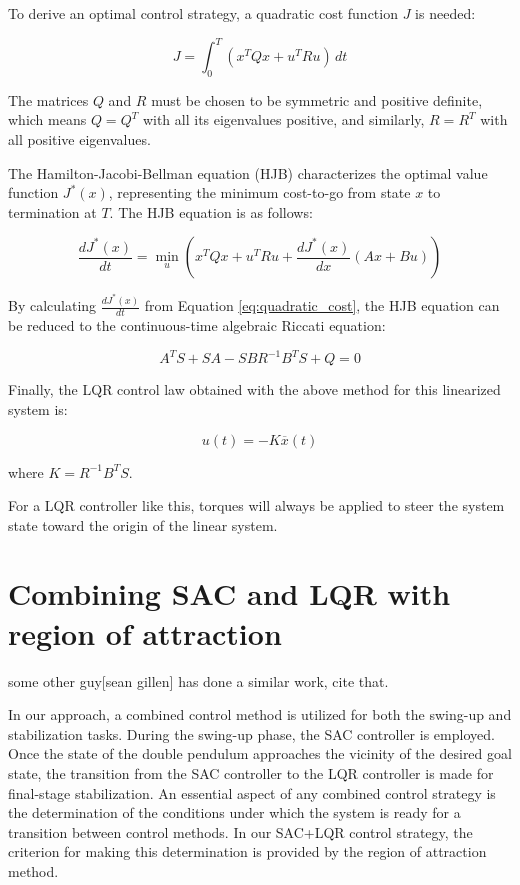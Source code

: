 To derive an optimal control strategy, a quadratic cost function \(J\) is needed:

\begin{equation}
  J = \int_0^{T} \left( x^T Q x + u^T R u \right) \, dt
  \label{eq:quadratic_cost}
\end{equation}

The matrices \(Q\) and \(R\) must be chosen to be symmetric and positive definite, which means \(Q = Q^T\) with all its eigenvalues positive, and similarly, \(R = R^T\) with all positive eigenvalues.

The Hamilton-Jacobi-Bellman equation (HJB) characterizes the optimal value function \(J^*(x)\), representing the minimum cost-to-go from state \(x\) to termination at \(T\). The HJB equation is as follows:

\begin{equation}
 \frac{dJ^*(x)}{dt} = \min_u \left( x^T Q x + u^T R u + \frac{dJ^*(x)}{dx} (Ax + Bu) \right)
 \label{eq:HJB}
\end{equation}

By calculating \(\frac{dJ^*(x)}{dt}\) from Equation \ref{eq:quadratic_cost}, the HJB equation can be reduced to the continuous-time algebraic Riccati equation:

\begin{equation}
 A^T S + SA - SBR^{-1}B^T S + Q = 0
\end{equation}

Finally, the LQR control law obtained with the above method for this linearized system is:

\begin{equation}
 u(t) = -K\overline{x}(t)
\end{equation}

where \(K = R^{-1}B^T S\).

For a LQR controller like this, torques will always be applied to steer the system state toward the origin of the linear system.


\section{Combining SAC and LQR with region of attraction}
some other guy[sean gillen] has done a similar work, cite that.

In our approach, a combined control method is utilized for both the swing-up and stabilization tasks. During the swing-up phase, the SAC controller is employed. Once the state of the double pendulum approaches the vicinity of the desired goal state, the transition from the SAC controller to the LQR controller is made for final-stage stabilization. An essential aspect of any combined control strategy is the determination of the conditions under which the system is ready for a transition between control methods. In our SAC+LQR control strategy, the criterion for making this determination is provided by the region of attraction method\cite{maywald2022co}.

